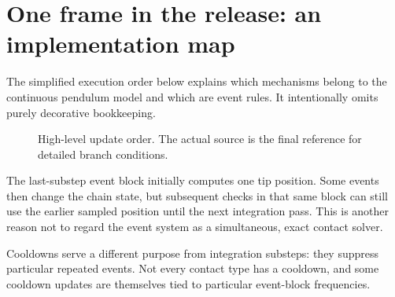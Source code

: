 \documentclass[11pt,a4paper]{article}
\begin{document}
\section{One frame in the release: an implementation map}
The simplified execution order below explains which mechanisms belong to the continuous pendulum model and which are event rules. It intentionally omits purely decorative bookkeeping.
\begin{figure}[H]\centering
{}\caption{High-level update order. The actual source is the final reference for detailed branch conditions.}
\end{figure}
The last-substep event block initially computes one tip position. Some events then change the chain state, but subsequent checks in that same block can still use the earlier sampled position until the next integration pass. This is another reason not to regard the event system as a simultaneous, exact contact solver.

Cooldowns serve a different purpose from integration substeps: they suppress particular repeated events. Not every contact type has a cooldown, and some cooldown updates are themselves tied to particular event-block frequencies.
\end{document}
